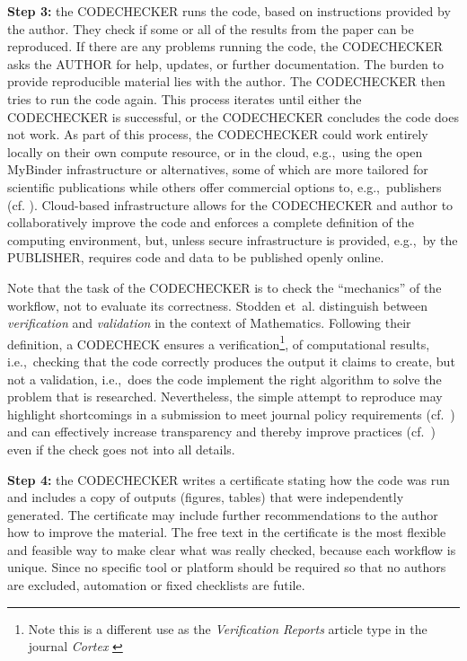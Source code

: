 \documentclass[12pt]{article}
\begin{document}
\textbf{Step 3:} the CODECHECKER runs the code, based on instructions provided by
the author. They check if some or all of the results from the paper can be
reproduced. If there are
any problems running the code, the CODECHECKER asks the AUTHOR for help,
updates, or further documentation.
The burden to provide reproducible material lies with the author.
The CODECHECKER then tries to run the code again.
This process iterates until either the CODECHECKER is successful,
or the CODECHECKER concludes the code does not work.
As part of this process, the CODECHECKER could work entirely
locally on their own compute resource, or in the cloud, e.g.,~using the open
MyBinder infrastructure \cite{jupyter_binder_2018} or alternatives, some of which
are more tailored for scientific publications while others offer commercial
options to, e.g.,~publishers (cf. \cite{konkol_publishing_2020}).
Cloud-based 
infrastructure allows for the CODECHECKER and author to collaboratively improve
the code and enforces a complete definition of the computing environment,
but, unless secure infrastructure is provided, e.g.,~by the PUBLISHER,
requires code and data to be published openly online.

Note that the task of the CODECHECKER is to check the ``mechanics'' of the
workflow, not to evaluate its correctness. 
Stodden et~al. \cite{stodden_setting_2013} distinguish between \emph{verification}
and \emph{validation}
in the context of Mathematics. Following their definition, a CODECHECK
ensures a verification\footnote{Note this is a different use as the
\emph{Verification Reports} 
article type in the journal \emph{Cortex} \cite{chambers_verification_2020}},
of computational results, i.e.,~checking that the code correctly produces the 
output it claims to create, but not a validation, i.e.,~does the code implement
the right algorithm to solve the problem that is researched.
Nevertheless, the simple attempt to reproduce may highlight shortcomings in
a submission to meet journal policy requirements
(cf.~\cite{christian_journal_2020})
and can effectively increase transparency and thereby improve practices
(cf.~\cite{nosek_scientific_2012})
even if the check goes not into all details.

\textbf{Step 4:} the CODECHECKER writes a certificate stating how the code was
run and includes a copy of outputs (figures, tables) that were
independently generated. The certificate may include further recommendations to
the author how to improve the material.
The free text in the certificate is the most flexible and feasible way to 
make clear what was really checked, because each workflow is unique.
Since no specific tool or platform should be required so that no authors are
excluded, automation or fixed checklists are futile.
\end{document}
